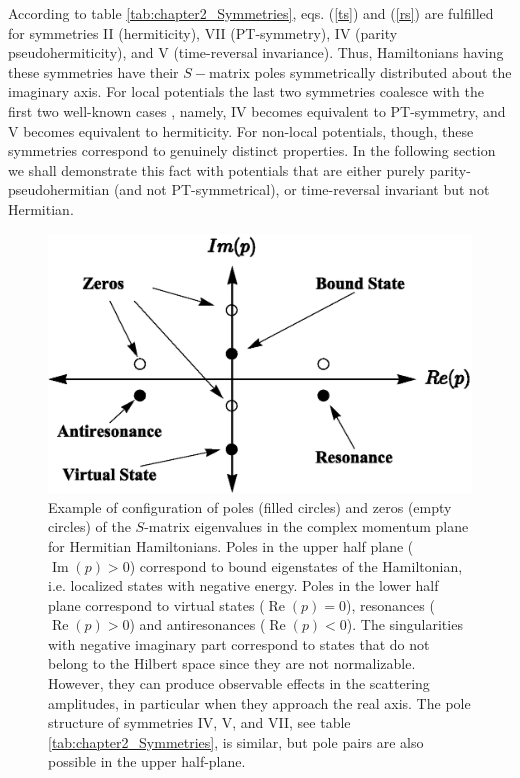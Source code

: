 According to table \ref{tab:chapter2_Symmetries},  eqs. (\ref{ts}) and (\ref{rs}) are fulfilled
for symmetries  II (hermiticity), VII (PT-symmetry), IV (parity pseudohermiticity),
and V (time-reversal invariance). Thus, Hamiltonians having these symmetries have their $S-$matrix poles symmetrically distributed about the imaginary axis. For local potentials the last two symmetries coalesce with the first two well-known
cases \cite{Ruschhaupt2017}, namely,
IV becomes equivalent to PT-symmetry, and V becomes equivalent to hermiticity. For non-local potentials, though, these symmetries
correspond to genuinely distinct properties. In the following section we shall demonstrate this fact with potentials that are
either purely parity-pseudohermitian (and not PT-symmetrical), or time-reversal invariant but not Hermitian.
%


\begin{figure}[h]
  \centering
  \includegraphics[width=0.75\linewidth]{Figures/DiagramPoles.eps}
  \caption{Example of configuration of poles (filled circles) and zeros (empty circles) of the $S$-matrix eigenvalues in the complex momentum plane for Hermitian Hamiltonians.  Poles in the upper half plane ($\operatorname{Im}(p) > 0$) correspond to bound eigenstates of the Hamiltonian, i.e. localized states with negative energy. Poles in the lower half plane correspond to  virtual states ($\operatorname{Re}(p) = 0$), resonances ($\operatorname{Re}(p) > 0$) and antiresonances ($\operatorname{Re}(p)<0$). The singularities with negative imaginary part correspond to states that do not belong to the Hilbert space since they are not normalizable. However, they can produce observable effects in the scattering amplitudes, in particular when they approach the real axis. The pole structure of symmetries IV, V, and VII, see table \ref{tab:chapter2_Symmetries},
  is similar, but pole pairs are also possible in the upper half-plane.}
  \label{fig:DiagramPoles}
\end{figure}

